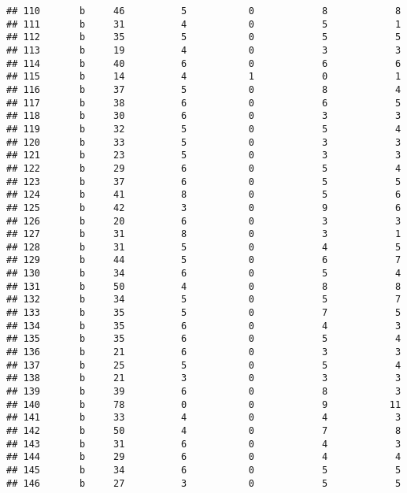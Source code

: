 \documentclass[
]{article}
\begin{document}
\begin{verbatim}
## 110       b     46          5           0            8            8
## 111       b     31          4           0            5            1
## 112       b     35          5           0            5            5
## 113       b     19          4           0            3            3
## 114       b     40          6           0            6            6
## 115       b     14          4           1            0            1
## 116       b     37          5           0            8            4
## 117       b     38          6           0            6            5
## 118       b     30          6           0            3            3
## 119       b     32          5           0            5            4
## 120       b     33          5           0            3            3
## 121       b     23          5           0            3            3
## 122       b     29          6           0            5            4
## 123       b     37          6           0            5            5
## 124       b     41          8           0            5            6
## 125       b     42          3           0            9            6
## 126       b     20          6           0            3            3
## 127       b     31          8           0            3            1
## 128       b     31          5           0            4            5
## 129       b     44          5           0            6            7
## 130       b     34          6           0            5            4
## 131       b     50          4           0            8            8
## 132       b     34          5           0            5            7
## 133       b     35          5           0            7            5
## 134       b     35          6           0            4            3
## 135       b     35          6           0            5            4
## 136       b     21          6           0            3            3
## 137       b     25          5           0            5            4
## 138       b     21          3           0            3            3
## 139       b     39          6           0            8            3
## 140       b     78          0           0            9           11
## 141       b     33          4           0            4            3
## 142       b     50          4           0            7            8
## 143       b     31          6           0            4            3
## 144       b     29          6           0            4            4
## 145       b     34          6           0            5            5
## 146       b     27          3           0            5            5

\end{verbatim}
\end{document}
